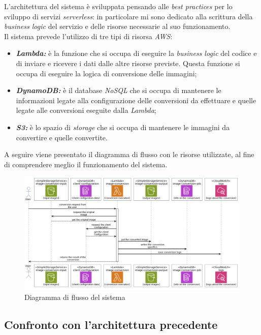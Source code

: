 L'architettura del sistema è sviluppata pensando alle \emph{best practices} per
lo sviluppo di servizi \emph{serverless}: in particolare mi sono dedicato alla
scrittura della \emph{business logic} del servizio e delle risorse necessarie al
suo funzionamento. \\
Il sistema prevede l'utilizzo di tre tipi di risorsa \emph{AWS}:
\begin{itemize}
      \item \textbf{\emph{Lambda:}} è la funzione che si occupa di eseguire la
            \emph{business logic} del codice e di inviare e ricevere i dati dalle altre risorse
            previste. Questa funzione si occupa di eseguire la logica di
            conversione delle immagini;
      \item \textbf{\emph{DynamoDB:}} è il database \emph{NoSQL} che si occupa di
            mantenere le informazioni legate alla configurazione delle conversioni da
            effettuare e quelle legate alle conversioni eseguite dalla \emph{Lambda};
      \item \textbf{\emph{S3:}} è lo spazio di \emph{storage} che si occupa di
            mantenere le immagini da convertire e quelle convertite.
\end{itemize}

A seguire viene presentato il diagramma di flusso con le risorse utilizzate, al
fine di comprendere meglio il funzionamento del sistema.
\begin{figure}[H]
      \centering
      \includegraphics[width=1\textwidth]{images/diagramma-flusso.png}
      \caption{Diagramma di flusso del sistema}
      \label{fig:diagramma-flusso}
\end{figure}

\subsection{Confronto con l'architettura precedente}

